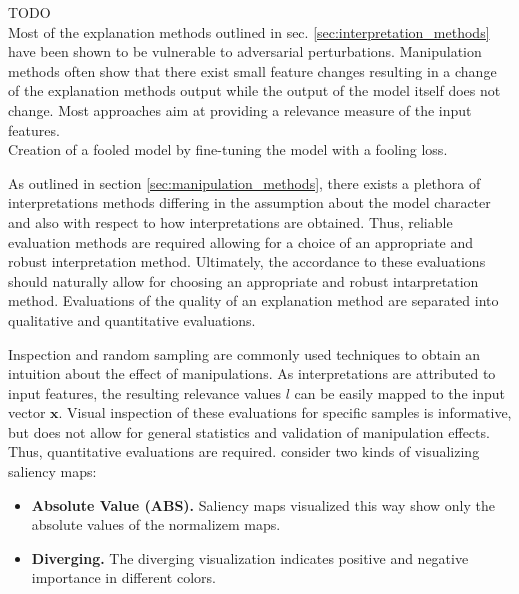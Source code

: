 TODO \\
Most of the explanation methods outlined in sec. \autoref{sec:interpretation_methods} have been shown to be vulnerable to adversarial perturbations. 
Manipulation methods often show that there exist small feature changes resulting in a change of the explanation methods output while the output of the model itself does not change. 
Most approaches aim at providing a relevance measure of the input features. \\

Creation of a fooled model by fine-tuning the model with a fooling loss. 


As outlined in section \autoref{sec:manipulation_methods}, there exists a plethora of interpretations methods differing in the assumption about the model character and also with respect to how interpretations are obtained. Thus, reliable evaluation methods are required allowing for a choice of an appropriate and robust interpretation method. Ultimately, the accordance to these evaluations should naturally allow for choosing an appropriate and robust intarpretation method.  
Evaluations of the quality of an explanation method are separated into qualitative and quantitative evaluations. 

Inspection and random sampling are commonly used techniques to obtain an intuition about the effect of manipulations. 
As interpretations are attributed to input features, the resulting relevance values $l$ can be easily mapped to the input vector $\mathbf{x}$. Visual inspection of these evaluations for specific samples is informative, but does not allow for general statistics and validation of manipulation effects. Thus, quantitative evaluations are required. 
\cite{adebayo2018sanity} consider two kinds of visualizing saliency maps: 
\begin{itemize}
    \item \textbf{Absolute Value (ABS).} Saliency maps visualized this way show only the absolute values of the normalizem maps.
    \item \textbf{Diverging. } The diverging visualization indicates positive and negative importance in different colors. 
\end{itemize}

